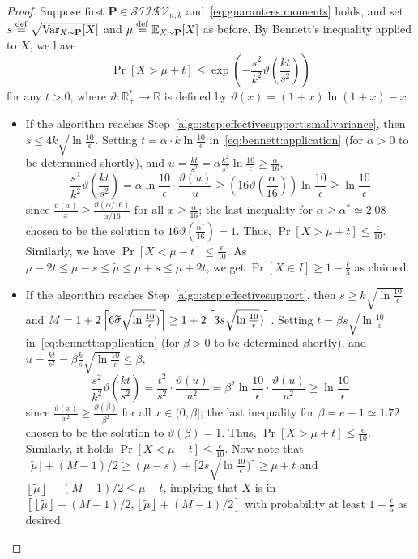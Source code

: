 \documentclass[11pt]{article}
\theoremstyle{definition}
\newcommand{\E}{\mathbb{E}}
\newcommand{\p}{\mathbf{P}}
\newcommand{\eps}{\epsilon}
\newcommand{\Var}{\mathop{\textnormal{Var}}\nolimits}
\newcommand{\eqdef}{\stackrel{{\mathrm {\footnotesize def}}}{=}}
\newcommand{\flr}[1]{\left\lfloor #1 \right\rfloor}
\newcommand{\classksiirv}[2][n]{\ensuremath{\mathcal{SIIRV}_{#1,#2}}\xspace}
\begin{document}
\begin{proof}Suppose first $\p\in\classksiirv[n]{k}$ and~\eqref{eq:guarantees:moments} holds, and set $s\eqdef \sqrt{\Var_{X\sim\p}[X]}$ and $\mu\eqdef \E_{X\sim\p}[X]$ as before. By Bennett's inequality applied to $X$, we have
  \begin{equation}\label{eq:bennett:application}
    \Pr[ X > \mu+t ] \leq \exp\left(- \frac{s^2}{k^2} \vartheta\left( \frac{kt}{s^2} \right) \right)
  \end{equation}
  for any $t>0$, where $\vartheta\colon\mathbb{R}_+^\ast\to\mathbb{R}$ is defined by $\vartheta(x) = (1+x)\ln(1+x)-x$.
\begin{itemize}
  \item If the algorithm reaches Step~\ref{algo:step:effectivesupport:smallvariance}, then $s\leq 4k \sqrt{\ln\frac{10}{\eps}}$. Setting $t=\alpha\cdot k \ln\frac{10}{\eps}$ in~\cref{eq:bennett:application} (for $\alpha>0$ to be determined shortly), and $u = \frac{kt}{s^2} = \alpha\frac{k^2}{s^2}\ln\frac{10}{\eps} \geq \frac{\alpha}{16}$, 
  \[
      \frac{s^2}{k^2} \vartheta\left( \frac{kt}{s^2} \right) = \alpha\ln\frac{10}{\eps} \cdot \frac{\vartheta\left( u \right)}{u}
      \geq \left(16\vartheta\left( \frac{\alpha}{16} \right)\right) \ln\frac{10}{\eps} \geq \ln\frac{10}{\eps}
  \]
  since $\frac{\vartheta\left(x\right)}{x} \geq \frac{\vartheta\left(\alpha/16\right)}{\alpha/16}$ for all $x\geq \frac{\alpha}{16}$; the last inequality for $\alpha\geq \alpha^\ast \simeq 2.08$ chosen to be the solution to $16\vartheta\left( \frac{\alpha^\ast}{16} \right)=1$. Thus, $\Pr[X > \mu+t] \leq \frac{\eps}{10}$. Similarly, we have $\Pr[ X < \mu-t ] \leq \frac{\eps}{10}$.
  As $\mu-2t\leq\mu-s\leq \widetilde{\mu} \leq \mu+s \leq \mu +2t$, we get $\Pr[ X \in I ] \geq 1-\frac{\eps}{5}$ as claimed.

  \item If the algorithm reaches Step~\ref{algo:step:effectivesupport}, then $s\geq k \sqrt{\ln\frac{10}{\eps}}$ and $M = 1+2\clg{ 6\widetilde{\sigma}\sqrt{\ln\frac{10}{\eps}}) } \geq 1+2\clg{ 3s\sqrt{\ln\frac{10}{\eps}}) }$. Setting $t=\beta s \sqrt{ \ln\frac{10}{\eps}}$ in~\cref{eq:bennett:application} (for $\beta>0$ to be determined shortly), and $u = \frac{kt}{s^2} = \beta\frac{k}{s}\sqrt{ \ln\frac{10}{\eps}}\leq \beta$, 
  \[
      \frac{s^2}{k^2} \vartheta\left( \frac{kt}{s^2} \right) = \frac{t^2}{s^2} \cdot \frac{\vartheta\left( u \right)}{u^2}
      = \beta^2\ln\frac{10}{\eps}\cdot \frac{\vartheta\left(u\right)}{u^2} \geq \ln\frac{10}{\eps}
  \]
  since $\frac{\vartheta\left(x\right)}{x^2} \geq \frac{\vartheta\left(\beta\right)}{\beta^2}$ for all $x\in(0,\beta]$; the last inequality for $\beta= e-1 \simeq 1.72$ chosen to be the solution to $\vartheta\left( \beta \right)=1$. Thus, $\Pr[X > \mu+t] \leq \frac{\eps}{10}$. Similarly, it holds $\Pr[ X < \mu-t ] \leq \frac{\eps}{10}.$
Now note that $ \lfloor\widetilde{\mu} \rfloor+(M-1)/2 \geq (\mu-s)+\lceil 2s\sqrt{\ln\frac{10}{\eps}}) \rceil \geq \mu + t$
and $\flr{ \widetilde{\mu} } - (M-1)/2 \leq \mu-t$, implying that $X$ is in $[\flr{ \widetilde{\mu} }-(M-1)/2, \flr{ \widetilde{\mu} }+(M-1)/2]$ with probability at least $1- \frac{\eps}{5}$ as desired.
\end{itemize}


\end{proof}
\end{document}
